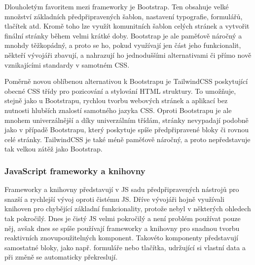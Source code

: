 		Dlouholetým favoritem mezi frameworky je Bootstrap.
		Ten obsahuje velké množství základních předpřipravených šablon, nastavení typografie, formulářů, tlačítek atd.
		Kromě toho lze využít komunitních šablon celých stránek a vytvořit finální stránky během velmi krátké doby.
		Bootstrap je ale paměťově náročný a mnohdy těžkopádný, a proto se ho, pokud využívají jen část jeho funkcionalit,
		někteří vývojáři zbavují, a nahrazují ho jednoduššími alternativami či přímo nově vznikajícími standardy
		v samotném \Ac{CSS}. \cite{bootstrap}

		Poměrně novou oblíbenou alternativou k Bootstrapu je TailwindCSS poskytující obecné \Ac{CSS} třídy pro
		pozicování a stylování \Ac{HTML} struktury.
		To umožňuje, stejně jako u Bootstrapu, rychlou tvorbu webových stránek a aplikací bez nutnosti hlubších znalostí
		samotného jazyka \Ac{CSS}. \cite{tailwindcss}
		Oproti Bootstrapu je ale mnohem univerzálnější a díky univerzálním třídám, stránky nevypadají podobně jako v případě
		Bootstrapu, který poskytuje spíše předpřipravené bloky či rovnou celé stránky.
		TailwindCSS je také méně paměťově náročný, a proto nepředstavuje tak velkou zátěž jako Bootstrap.
		\cite{tailwindcss_vs_bootstrap}

		\subsubsection{JavaScript frameworky a knihovny}

		Frameworky a knihovny představují v \ac{JS} sadu předpřipravených nástrojů pro snazší a rychlejší vývoj
		oproti čistému \ac{JS}.
		Dříve vývojáři hojně využívali knihoven pro chybějící základní funkcionality, protože nebyl v některých ohledech tak
		pokročilý.
		Dnes je čistý \ac{JS} velmi pokročilý a není problém používat pouze něj, avšak dnes se spíše
		používají frameworky a knihovny pro snadnou tvorbu reaktivních znovupoužitelných komponent.
		Takovéto komponenty představují samostatné bloky, jako např. formuláře nebo tlačítka, udržující si vlastní
		data a při změně se automaticky překreslují.

